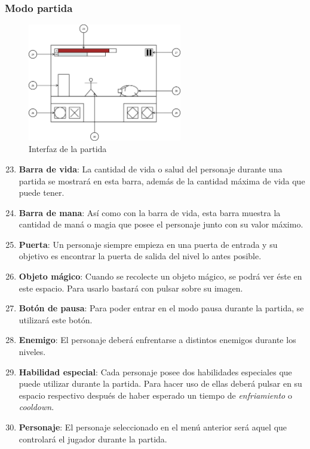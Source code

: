 \subsubsection{Modo partida}
\begin{figure}[H]
    \centering
    \includegraphics[width=0.6\textwidth]{5-Cuerpo/Chapter5/5.5/I6.png} %
    \caption{Interfaz de la partida}
    \label{fig:Interface_Partida}
\end{figure}
\begin{enumerate}\setcounter{enumi}{22}
    \item \textbf{Barra de vida}: La cantidad de vida o salud del personaje
    durante una partida se mostrará en esta barra, además de la cantidad máxima
    de vida que puede tener.
    \item \textbf{Barra de mana}: Así como con la barra de vida, esta barra
    muestra la cantidad de maná o magia que posee el personaje junto con su
    valor máximo.
    \item \textbf{Puerta}: Un personaje siempre empieza en una puerta
    de entrada y su objetivo es encontrar la puerta de salida del nivel lo antes
    posible.
    \item \textbf{Objeto mágico}: Cuando se recolecte un objeto mágico, se podrá
    ver éste en este espacio. Para usarlo bastará con pulsar sobre su imagen.
    \item \textbf{Botón de pausa}: Para poder entrar en el modo pausa durante la
    partida, se utilizará este botón.
    \item \textbf{Enemigo}: El personaje deberá enfrentarse a distintos enemigos
    durante los niveles.
    \item \textbf{Habilidad especial}: Cada personaje posee dos habilidades
    especiales que puede utilizar durante la partida. Para hacer uso de ellas
    deberá pulsar en su espacio respectivo después de haber esperado un tiempo
    de \emph{enfriamiento} o \emph{cooldown}.
    \item \textbf{Personaje}: El personaje seleccionado en el menú anterior será
    aquel que controlará el jugador durante la partida.
\end{enumerate}

